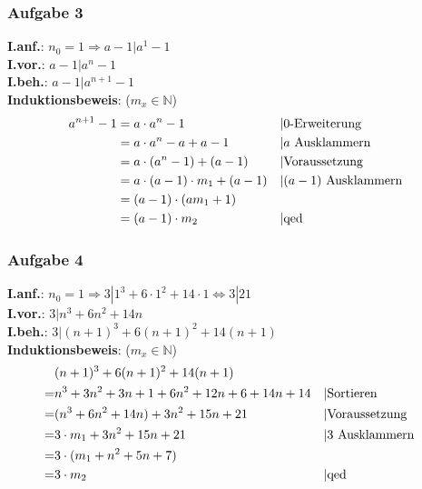 \subsubsection{Aufgabe 3}
\textbf{I.anf.}: $ n_0 = 1 \Rightarrow a-1|a^1-1$\\
\textbf{I.vor.}: $ a-1 | a^n-1 $\\
\textbf{I.beh.}: $ a-1 | a^{n+1}-1 $\\
\textbf{Induktionsbeweis}: ($m_x \in \mathbb{N}$)\begin{align*}
a^{n+1}-1 &= a \cdot a^n - 1 				&& \text{\textbar 0-Erweiterung}\\
					&= a \cdot a^n - a + a - 1 		&& \text{\textbar $a$ Ausklammern}\\
					&= a \cdot (a^n - 1) + (a-1) 	&& \text{\textbar Voraussetzung}\\
					&= a \cdot (a-1) \cdot m_1 + (a-1) 	&& \text{\textbar $(a-1)$ Ausklammern}\\
					&= (a-1) \cdot (a m_1 + 1) 					\\
					&= (a-1) \cdot m_2  								&& \text{\textbar qed}\end{align*}		
\subsubsection{Aufgabe 4}
\textbf{I.anf.}: $ n_0 = 1 \Rightarrow 3|1^3+6\cdot1^2+14\cdot1 \Leftrightarrow 3|21$\\
\textbf{I.vor.}: $ 3 | n^3 + 6n^2 + 14n $\\
\textbf{I.beh.}: $ 3 | (n+1)^3 + 6(n+1)^2 + 14(n+1) $\\
\textbf{Induktionsbeweis}: ($m_x \in \mathbb{N}$)\begin{align*}
&(n+1)^3 + 6(n+1)^2 + 14(n+1) \\
= &n^3+3n^2+3n+1+6n^2+12n+6+14n+14			&& \text{\textbar Sortieren}\\
														= &(n^3 + 6n^2 + 14n) + 3n^2 + 15n + 21		&& \text{\textbar Voraussetzung}\\
														= &3 \cdot m_1 + 3n^2 + 15n + 21 					&& \text{\textbar $3$ Ausklammern}\\
														= &3 \cdot (m_1 + n^2 + 5n + 7) 					\\
														= &3 \cdot m_2 														&& \text{\textbar qed}\end{align*}		

